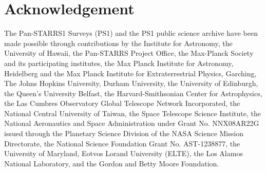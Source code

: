 \documentclass[draft]{spieman}
\begin{document}
\section{Acknowledgement}
The Pan-STARRS1 Surveys (PS1) and the PS1 public science archive have been made possible through
contributions by the Institute for Astronomy, the University of Hawaii, the Pan-STARRS Project
Office, the Max-Planck Society and its participating institutes, the Max Planck Institute for
Astronomy, Heidelberg and the Max Planck Institute for Extraterrestrial Physics, Garching, The Johns
Hopkins University, Durham University, the University of Edinburgh, the Queen's University Belfast,
the Harvard-Smithsonian Center for Astrophysics, the Las Cumbres Observatory Global Telescope
Network Incorporated, the National Central University of Taiwan, the Space Telescope Science
Institute, the National Aeronautics and Space Administration under Grant No. NNX08AR22G issued
through the Planetary Science Division of the NASA Science Mission Directorate, the National Science
Foundation Grant No. AST-1238877, the University of Maryland, Eotvos Lorand University (ELTE), the
Los Alamos National Laboratory, and the Gordon and Betty Moore Foundation.





\end{document}
